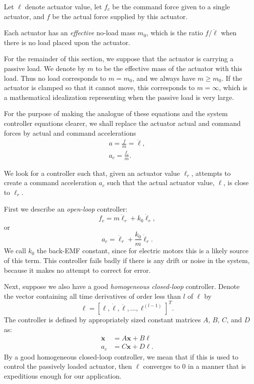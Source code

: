 \documentclass[reqno,twocolumn]{amsart}
\renewcommand{\mathsf}{}
\begin{document}
Let $\ell$ denote actuator value, let $f_c$ be the command force given to a single actuator, and $f$ be the actual force supplied by this actuator.

Each actuator has an \emph{effective} no-load mass $m_0$, which is the ratio $f/\ddot \ell$ when there is no load placed upon the actuator.

For the remainder of this section, we suppose that the actuator is carrying a passive load.  We denote by $m$ to be the effective mass of the actuator with this load.  Thus no load corresponds to $m=m_0$, and we always have $m \ge m_0$.  If the actuator is clamped so that it cannot move, this corresponds to $m = \infty$, which is a mathematical idealization representing when the passive load is very large.

For the purpose of making the analogue of these equations and the system controller equations clearer, we shall replace the actuator actual and command forces by actual and command accelerations
\begin{gather}
a = \frac fm = \ddot \ell, \\
a_c = \frac {f_c}m .
\end{gather}

We look for a controller such that, given an actuator value $\ell_r$, attempts to create a command acceleration $a_c$ such that the actual actuator value, $\ell$, is close to $\ell_r$.

First we describe an \emph{open-loop} controller:
\begin{equation}
\label{pre approx open-loop}
f_c = m \ddot \ell_r + k_0 \dot \ell_r,
\end{equation}
or
\begin{equation}
\label{approx open-loop}
a_c = \ddot \ell_r + \frac{k_0}m \dot \ell_r.
\end{equation}
We call $k_0$ the back-EMF constant, since for electric motors this is a likely source of this term.  This controller fails badly if there is any drift or noise in the system, because it makes no attempt to correct for error.

Next, suppose we also have a good \emph{homogeneous closed-loop} controller.  Denote the vector containing all time derivatives of order less than $l$ of $\ell$ by
\begin{equation}\bm \ell = [\ell, \dot \ell, \ddot \ell, \dots, \ell^{(l-1)}]^T .
\end{equation}
The controller is defined by appropriately sized constant matrices $\mathsf A$, $\mathsf B$, $\mathsf C$, and $\mathsf D$ as:
\begin{align}
\label{hom closed-loop}
\dot {\bm x} &= \mathsf A \bm x + \mathsf B \ell \\
\label{hom closed-loop 2}
a_c &= \mathsf C \bm x + \mathsf D \bm \ell.
\end{align}
By a good homogeneous closed-loop controller, we mean that if this is used to control the passively loaded actuator, then $\ell$ converges to $0$ in a manner that is expeditious enough for our application.
\end{document}
